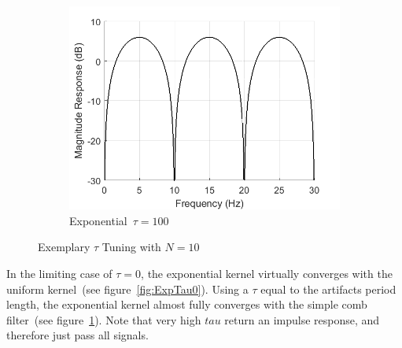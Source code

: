 \documentclass[a4paper]{article}
\newcommand{\figref}[1]{(see figure~\ref{#1})}
\begin{document}
\begin{figure}[hbtp]
\begin{subfigure}{.33\textwidth}
        \includegraphics[width=\textwidth]{img/tau/mag_exp_100.png}
        \caption{Exponential~$\tau=100$}\label{fig:ExpTau100}
    \end{subfigure}
    \caption{Exemplary $\tau$ Tuning with $N=10$}\label{fig:ExemplaryTauTuning}
\end{figure}

In the limiting case of $\tau = 0$, the exponential kernel virtually converges with the uniform kernel~\figref{fig:ExpTau0}. Using a $\tau$ equal to the artifacts period length, the exponential kernel almost fully converges with the simple comb filter~\figref{fig:ExpTau100}. Note that very high $tau$ return an impulse response, and therefore just pass all signals.
\end{document}
